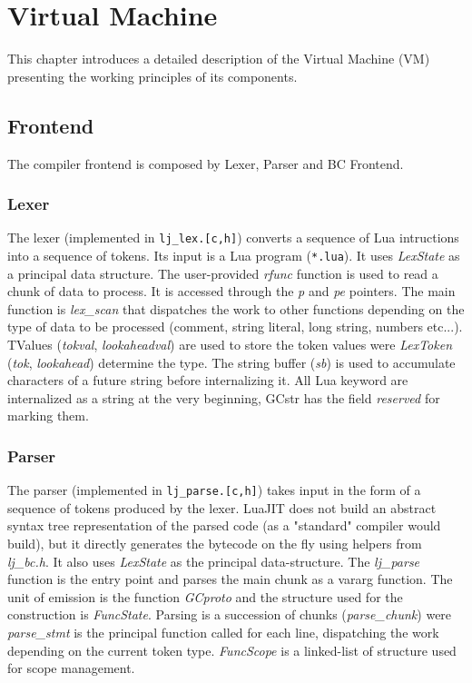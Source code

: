 \chapter{Virtual Machine}
This chapter introduces a detailed description of the Virtual Machine (VM) presenting the working principles of its components.
\section{Frontend}
The compiler frontend is composed by Lexer, Parser and BC Frontend.
\subsection{Lexer}
\label{Subsec:Lexer}

The lexer (implemented in \texttt{lj\_lex.[c,h]}) converts a sequence of Lua intructions into a sequence of tokens. Its input is a Lua program (\texttt{*.lua}). It uses \textit{LexState} as a principal data structure. The user-provided \textit{rfunc} function is used to read a chunk of data to process. It is accessed through the \textit{p} and \textit{pe} pointers. The main function is \textit{lex\_scan} that dispatches the work to other functions depending on the type of data to be processed (comment, string literal, long string, numbers etc...). TValues (\textit{tokval}, \textit{lookaheadval}) are used to store the token values were \textit{LexToken} (\textit{tok}, \textit{lookahead}) determine the type. The string buffer (\textit{sb}) is used to accumulate characters of a future string before internalizing it. All Lua keyword are internalized as a string at the very beginning, GCstr has the field \textit{reserved} for marking them.

\subsection{Parser}
\label{Subsec:Parser}
The parser (implemented in \texttt{lj\_parse.[c,h]}) takes input in the form of a sequence of tokens produced by the lexer. LuaJIT does not build an abstract syntax tree representation of the parsed code (as a "standard" compiler would build), but it directly generates the bytecode on the fly using helpers from \textit{lj\_bc.h}. It also uses \textit{LexState} as the principal data-structure. The \textit{lj\_parse} function is the entry point and parses the main chunk as a vararg function. The unit of emission is the function \textit{GCproto} and the structure used for the construction is \textit{FuncState}. Parsing is a succession of chunks (\textit{parse\_chunk}) were \textit{parse\_stmt} is the principal function called for each line, dispatching the work depending on the current token type. \textit{FuncScope} is a linked-list of structure used for scope management.

